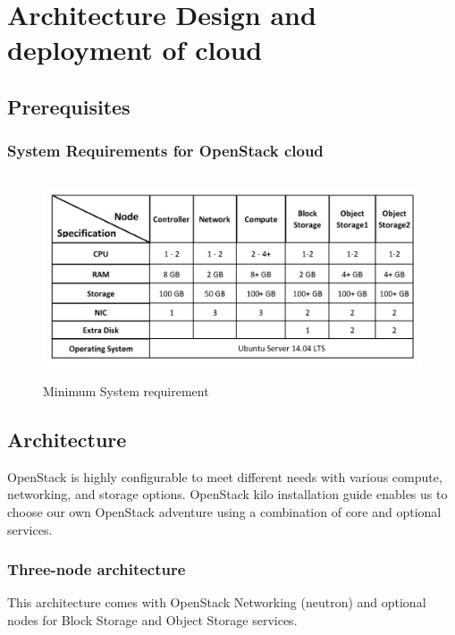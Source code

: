 \chapter{Architecture Design and deployment of cloud}

    \section{Prerequisites}
        \subsection{System Requirements for OpenStack cloud}
        \begin{figure}[h]
             \centering
            \includegraphics[height=6cm,width=13cm]{images/hw.png}
            \caption{Minimum System requirement} %
        \end{figure}

\section{Architecture}
    \par OpenStack is highly configurable to meet different needs with various compute, networking, and storage options. OpenStack kilo installation guide enables us to choose our own OpenStack adventure using a combination of core and optional services.
    
    \subsection{Three-node architecture}
    \par This architecture comes with OpenStack Networking (neutron) and optional nodes for Block Storage and Object Storage services.
    
